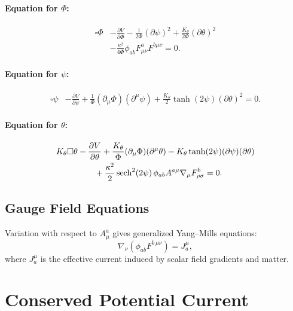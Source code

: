 \documentclass[12pt]{article}
\begin{document}
\paragraph{Equation for \(\Phi\):}
\begin{align}
\square \Phi
&-
\frac{\partial V}{\partial\Phi}
-\frac{1}{2\Phi}(\partial\psi)^2
+\frac{K_\theta}{2\Phi}(\partial\theta)^2
\nonumber\\
&-
\frac{\kappa^2}{4\Phi}\phi_{ab}F^a_{\mu\nu}F^{b\mu\nu}
= 0.
\end{align}

\paragraph{Equation for \(\psi\):}
\begin{align}
\square\psi
&-
\frac{\partial V}{\partial\psi}
+\frac{1}{\Phi}(\partial_\mu\Phi)(\partial^\mu\psi)
+\frac{K_\theta}{2}\tanh(2\psi)(\partial\theta)^2
= 0.
\end{align}

\paragraph{Equation for \(\theta\):}
\begin{align}
K_\theta \square\theta
&-
\frac{\partial V}{\partial\theta}
+\frac{K_\theta}{\Phi}(\partial_\mu\Phi)(\partial^\mu\theta)
-K_\theta \tanh(2\psi)(\partial\psi)(\partial\theta)
\nonumber\\
&\qquad
+\frac{\kappa^2}{2}\sech^2(2\psi)\,
\phi_{ab}A^{a\mu}\nabla_\mu F^{b}_{\rho\sigma}
= 0.
\end{align}


\subsection{Gauge Field Equations}

Variation with respect to \(A^a_\mu\) gives generalized Yang–Mills equations:
\begin{equation}
\nabla_\nu(\phi_{ab}F^{b\,\mu\nu})
=
J^\mu_a,
\end{equation}
where \(J^\mu_a\) is the effective current induced by scalar field gradients and 
matter.


\newpage
\section{Conserved Potential Current}
\end{document}
